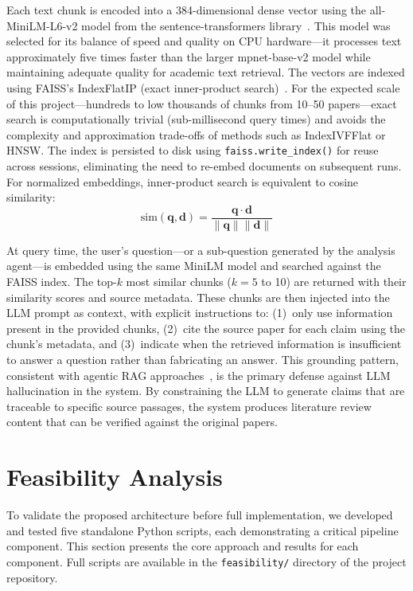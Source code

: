 \documentclass[12pt,a4paper]{article}
\begin{document}
Each text chunk is encoded into a 384-dimensional dense vector using the all-MiniLM-L6-v2 model from the sentence-transformers library~\citep{reimers2019sbert}. This model was selected for its balance of speed and quality on CPU hardware---it processes text approximately five times faster than the larger mpnet-base-v2 model while maintaining adequate quality for academic text retrieval. The vectors are indexed using FAISS's IndexFlatIP (exact inner-product search)~\citep{johnson2019faiss}. For the expected scale of this project---hundreds to low thousands of chunks from 10--50 papers---exact search is computationally trivial (sub-millisecond query times) and avoids the complexity and approximation trade-offs of methods such as IndexIVFFlat or HNSW. The index is persisted to disk using \texttt{faiss.write\_index()} for reuse across sessions, eliminating the need to re-embed documents on subsequent runs. For normalized embeddings, inner-product search is equivalent to cosine similarity:
$$\text{sim}(\mathbf{q}, \mathbf{d}) = \frac{\mathbf{q} \cdot \mathbf{d}}{\|\mathbf{q}\| \|\mathbf{d}\|}$$

At query time, the user's question---or a sub-question generated by the analysis agent---is embedded using the same MiniLM model and searched against the FAISS index. The top-$k$ most similar chunks ($k = 5$ to 10) are returned with their similarity scores and source metadata. These chunks are then injected into the LLM prompt as context, with explicit instructions to: (1)~only use information present in the provided chunks, (2)~cite the source paper for each claim using the chunk's metadata, and (3)~indicate when the retrieved information is insufficient to answer a question rather than fabricating an answer. This grounding pattern, consistent with agentic RAG approaches~\citep{singh2025agenticrag}, is the primary defense against LLM hallucination in the system. By constraining the LLM to generate claims that are traceable to specific source passages, the system produces literature review content that can be verified against the original papers.

\section{Feasibility Analysis}

To validate the proposed architecture before full implementation, we developed and tested five standalone Python scripts, each demonstrating a critical pipeline component. This section presents the core approach and results for each component. Full scripts are available in the \texttt{feasibility/} directory of the project repository.
\end{document}
